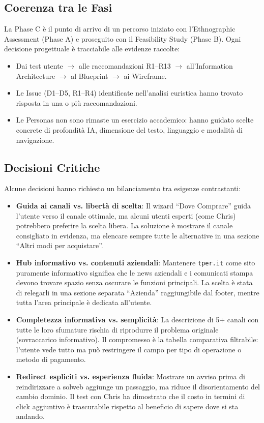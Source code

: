 \subsection{Coerenza tra le Fasi}

La Phase C \`e il punto di arrivo di un percorso iniziato con l'Ethnographic Assessment (Phase A) e proseguito con il Feasibility Study (Phase B). Ogni decisione progettuale \`e tracciabile alle evidenze raccolte:

\begin{itemize}
    \item Dai test utente $\rightarrow$ alle raccomandazioni R1--R13 $\rightarrow$ all'Information Architecture $\rightarrow$ al Blueprint $\rightarrow$ ai Wireframe.
    \item Le Issue (D1--D5, R1--R4) identificate nell'analisi euristica hanno trovato risposta in una o pi\`u raccomandazioni.
    \item Le Personas non sono rimaste un esercizio accademico: hanno guidato scelte concrete di profondit\`a IA, dimensione del testo, linguaggio e modalit\`a di navigazione.
\end{itemize}

\subsection{Decisioni Critiche}

Alcune decisioni hanno richiesto un bilanciamento tra esigenze contrastanti:

\begin{itemize}
    \item \textbf{Guida ai canali vs. libert\`a di scelta}: Il wizard ``Dove Comprare'' guida l'utente verso il canale ottimale, ma alcuni utenti esperti (come Chris) potrebbero preferire la scelta libera. La soluzione \`e mostrare il canale consigliato in evidenza, ma elencare sempre tutte le alternative in una sezione ``Altri modi per acquistare''.
    \item \textbf{Hub informativo vs. contenuti aziendali}: Mantenere \texttt{tper.it} come sito puramente informativo significa che le news aziendali e i comunicati stampa devono trovare spazio senza oscurare le funzioni principali. La scelta \`e stata di relegarli in una sezione separata ``Azienda'' raggiungibile dal footer, mentre tutta l'area principale \`e dedicata all'utente.
    \item \textbf{Completezza informativa vs. semplicit\`a}: La descrizione di 5+ canali con tutte le loro sfumature rischia di riprodurre il problema originale (sovraccarico informativo). Il compromesso \`e la tabella comparativa filtrabile: l'utente vede tutto ma pu\`o restringere il campo per tipo di operazione o metodo di pagamento.
    \item \textbf{Redirect espliciti vs. esperienza fluida}: Mostrare un avviso prima di reindirizzare a solweb aggiunge un passaggio, ma riduce il disorientamento del cambio dominio. Il test con Chris ha dimostrato che il costo in termini di click aggiuntivo \`e trascurabile rispetto al beneficio di sapere dove si sta andando.
\end{itemize}

